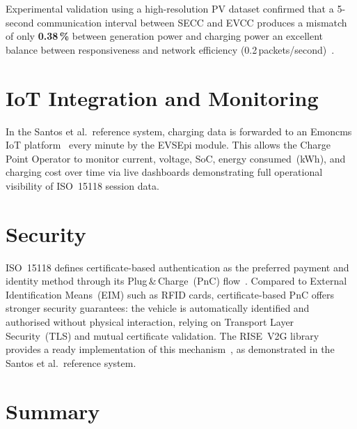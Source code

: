 \documentclass[12pt,a4paper]{report}
\begin{document}
Experimental validation using a high-resolution PV dataset confirmed that a 5-second
communication interval between SECC and EVCC produces a mismatch of only \textbf{0.38\,\%}
between generation power and charging power an excellent balance between responsiveness
and network efficiency (0.2\,packets/second)~\autocite{santos2024}.

\section{IoT Integration and Monitoring}

In the Santos et al.\ reference system, charging data is forwarded to an Emoncms IoT
platform~\autocite{emoncms} every minute by the EVSEpi module. This allows the Charge Point
Operator to monitor current, voltage, SoC, energy consumed~(kWh), and charging cost over time
via live dashboards  demonstrating full operational visibility of ISO~15118 session data.

\section{Security}

ISO~15118 defines certificate-based authentication as the preferred payment and identity method
through its Plug\,\&\,Charge~(PnC) flow~\autocite{iso15118_2022}. Compared to External
Identification Means~(EIM) such as RFID cards, certificate-based PnC offers stronger security
guarantees: the vehicle is automatically identified and authorised without physical interaction,
relying on Transport Layer Security~(TLS) and mutual certificate validation. The RISE~V2G
library provides a ready implementation of this mechanism~\autocite{rise_v2g}, as demonstrated
in the Santos et al.\ reference system.

\section{Summary}
\end{document}
